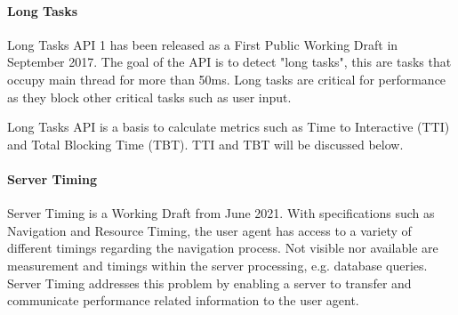 	









\paragraph{Long Tasks}

Long Tasks API 1 has been released as a First Public Working Draft in September 2017.
The goal of the API is to detect "long tasks", this are tasks that occupy main thread for more than 50ms.
Long tasks are critical for performance as they block other critical tasks such as user input. %

Long Tasks API is a basis to calculate metrics such as  Time to Interactive (TTI) and Total Blocking Time (TBT). %
TTI and TBT will be discussed below.







\paragraph{Server Timing}

Server Timing is a Working Draft from June 2021.
With specifications such as Navigation and Resource Timing, the user agent has access to a variety of different timings regarding the navigation process.
Not visible nor available are measurement and timings within the server processing, e.g. database queries.
Server Timing addresses this problem by enabling a server to transfer and communicate performance related information to the user agent. %



